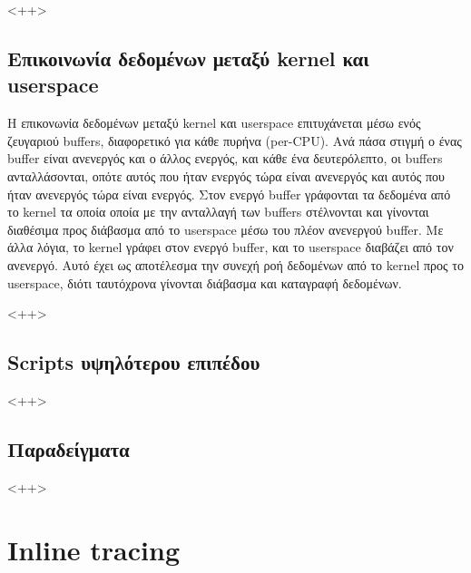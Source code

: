 \documentclass[12pt]{article}
\begin{document}
<++>

\subsection{Επικοινωνία δεδομένων μεταξύ kernel και userspace}


Η επικονωνία δεδομένων μεταξύ kernel και userspace επιτυχάνεται μέσω ενός
ζευγαριού buffers, διαφορετικό για κάθε πυρήνα (per-CPU). Aνά πάσα στιγμή ο
ένας buffer είναι ανενεργός και ο άλλος ενεργός, και κάθε ένα δευτερόλεπτο, οι
buffers ανταλλάσονται, οπότε αυτός που ήταν ενεργός τώρα είναι ανενεργός και
αυτός που ήταν ανενεργός τώρα είναι ενεργός. Στον ενεργό buffer γράφονται τα
δεδομένα από το kernel τα οποία οποία με την ανταλλαγή των buffers στέλνονται
και γίνονται διαθέσιμα προς διάβασμα από το userspace μέσω του πλέον ανενεργού
buffer. Με άλλα λόγια, το kernel γράφει στον ενεργό buffer, και το userspace
διαβάζει από τον ανενεργό. Αυτό έχει ως αποτέλεσμα την συνεχή ροή δεδομένων από
το kernel προς το userspace, διότι ταυτόχρονα γίνονται διάβασμα και καταγραφή
δεδομένων.

<++>

\subsection{Scripts υψηλότερου επιπέδου}


<++>

\subsection{Παραδείγματα}


<++>

\section{Inline tracing}

\end{document}
